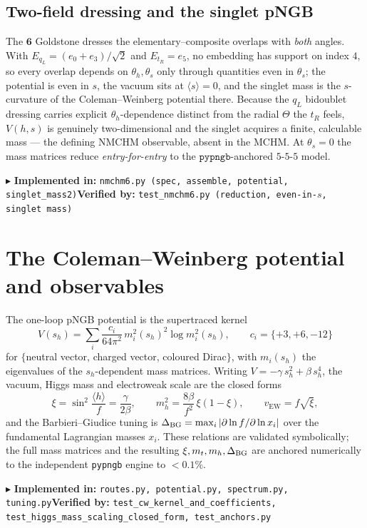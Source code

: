 \documentclass[11pt]{article}
\newcommand{\sh}{s_h}
\newcommand{\code}[1]{\texttt{#1}}
\newcommand{\impl}[2]{\par\smallskip\noindent\textcolor{blue!60!black}{\small$\blacktriangleright$ \textbf{Implemented in:} \code{#1}\quad\textbf{Verified by:} \code{#2}}\par\smallskip}
\begin{document}
\subsection{Two-field dressing and the singlet pNGB}
The $\mathbf 6$ Goldstone dresses the elementary--composite overlaps with \emph{both} angles. With
$E_{q_L}=(e_0+e_3)/\sqrt2$ and $E_{t_R}=e_5$, no embedding has support on index $4$, so every
overlap depends on $\theta_h,\theta_s$ only through quantities even in $\theta_s$; the potential is
even in $s$, the vacuum sits at $\langle s\rangle=0$, and the singlet mass is the $s$-curvature of
the Coleman--Weinberg potential there. Because the $q_L$ bidoublet dressing carries explicit
$\theta_h$-dependence distinct from the radial $\Theta$ the $t_R$ feels, $V(h,s)$ is genuinely
two-dimensional and the singlet acquires a finite, calculable mass --- the defining NMCHM
observable, absent in the MCHM. At $\theta_s=0$ the mass matrices reduce \emph{entry-for-entry} to
the $\code{pypngb}$-anchored $5$-$5$-$5$ model.
\impl{nmchm6.py (spec, assemble, potential, singlet\_mass2)}{test\_nmchm6.py (reduction, even-in-$s$, singlet mass)}

\section{The Coleman--Weinberg potential and observables}
The one-loop pNGB potential is the supertraced kernel
\begin{equation}
  V(\sh)=\sum_i \frac{c_i}{64\pi^2}\,m_i^2(\sh)^2\log m_i^2(\sh),
  \qquad c_i=\{+3,+6,-12\}
\end{equation}
for $\{$neutral vector, charged vector, coloured Dirac$\}$, with $m_i(\sh)$ the eigenvalues of the
$\sh$-dependent mass matrices. Writing $V=-\gamma\,\sh^2+\beta\,\sh^4$, the vacuum, Higgs mass and
electroweak scale are the closed forms
\begin{equation}
  \xi=\sin^2\!\frac{\langle h\rangle}{f}=\frac{\gamma}{2\beta},\qquad
  m_h^2=\frac{8\beta}{f^2}\,\xi(1-\xi),\qquad v_{\mathrm{EW}}=f\sqrt{\xi},
\end{equation}
and the Barbieri--Giudice tuning is $\Delta_{\rm BG}=\max_i|\partial\ln f/\partial\ln x_i|$ over the
fundamental Lagrangian masses $x_i$. These relations are validated symbolically; the full mass
matrices and the resulting $\xi,m_t,m_h,\Delta_{\rm BG}$ are anchored numerically to the
independent \code{pypngb} engine to $<0.1\%$.
\impl{routes.py, potential.py, spectrum.py, tuning.py}{test\_cw\_kernel\_and\_coefficients, test\_higgs\_mass\_scaling\_closed\_form, test\_anchors.py}
\end{document}
